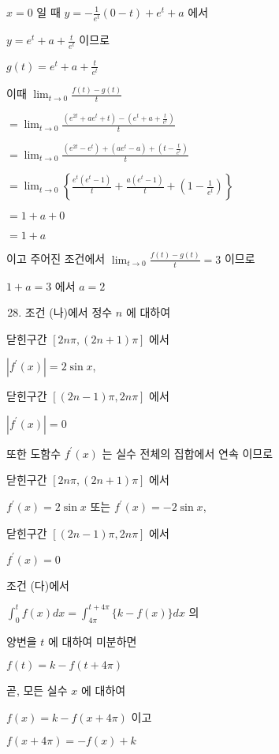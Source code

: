\documentclass[10pt]{article}
\begin{document}
\(x=0\) 일 때 \(y=-\frac{1}{e^{t}}(0-t)+e^{t}+a\) 에서

\(y=e^{t}+a+\frac{t}{e^{t}}\) 이므로

\(g(t)=e^{t}+a+\frac{t}{e^{t}}\)

이때 \(\lim _{t \rightarrow 0} \frac{f(t)-g(t)}{t}\)

\(=\lim _{t \rightarrow 0} \frac{\left(e^{2 t}+a e^{t}+t\right)-\left(e^{t}+a+\frac{t}{e^{t}}\right)}{t}\)

\(=\lim _{t \rightarrow 0} \frac{\left(e^{2 t}-e^{t}\right)+\left(a e^{t}-a\right)+\left(t-\frac{t}{e^{t}}\right)}{t}\)

\(=\lim _{t \rightarrow 0}\left\{\frac{e^{t}\left(e^{t}-1\right)}{t}+\frac{a\left(e^{t}-1\right)}{t}+\left(1-\frac{1}{e^{t}}\right)\right\}\)

\(=1+a+0\)

\(=1+a\)

이고 주어진 조건에서 \(\lim _{t \rightarrow 0} \frac{f(t)-g(t)}{t}=3\) 이므로

\(1+a=3\) 에서 \(a=2\)

\begin{enumerate}
  \setcounter{enumi}{27}
  \item 조건 (나)에서 정수 \(n\) 에 대하여
\end{enumerate}

닫힌구간 \([2 n \pi,(2 n+1) \pi]\) 에서

\(\left|f^{\prime}(x)\right|=2 \sin x\),

닫힌구간 \([(2 n-1) \pi, 2 n \pi]\) 에서

\(\left|f^{\prime}(x)\right|=0\)

또한 도함수 \(f^{\prime}(x)\) 는 실수 전체의 집합에서 연속 이므로

닫힌구간 \([2 n \pi,(2 n+1) \pi]\) 에서

\(f^{\prime}(x)=2 \sin x\) 또는 \(f^{\prime}(x)=-2 \sin x\),

닫힌구간 \([(2 n-1) \pi, 2 n \pi]\) 에서

\(f^{\prime}(x)=0\)

조건 (다)에서

\(\int_{0}^{t} f(x) d x=\int_{4 \pi}^{t+4 \pi}\{k-f(x)\} d x\) 의

양변을 \(t\) 에 대하여 미분하면

\(f(t)=k-f(t+4 \pi)\)

곧, 모든 실수 \(x\) 에 대하여

\(f(x)=k-f(x+4 \pi)\) 이고

\(f(x+4 \pi)=-f(x)+k\)
\end{document}
